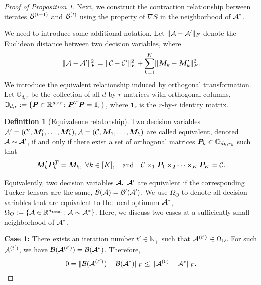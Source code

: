 \documentclass[11pt]{article}
\theoremstyle{plain}
\theoremstyle{definition}
\newtheorem{defn}{Definition}
\begin{document}
\begin{proof}[Proof of Proposition 1]
Next, we construct the contraction relationship between iterates $\mathcal{B}^{(t+1)}$ and $\mathcal{B}^{(t)}$ using the property of $\nabla S$ in the neighborhood of $\mathcal{A}^*$. 

We need to introduce some additional notation. Let $\lVert\mathcal{A}-\mathcal{A}'\rVert_F$ denote the Euclidean distance between two decision variables, where 
\begin{align}\label{eq:Fnorm}
 \lVert\mathcal{A}-\mathcal{A}'\rVert_F^2 = \lVert\mathcal{C} - \mathcal{C}'\rVert_F^2 + \sum_{k=1}^K \lVert\bm M_k - \bm M'_k\rVert_F^2.
\end{align} 
We introduce the equivalent relationship induced by orthogonal transformation. Let $\mathbb{O}_{d,r}$ be the collection of all $d$-by-$r$ matrices with orthogonal columns, $\mathbb{O}_{d,r}:=\{\bm{P}\in\mathbb{R}^{d\times r}\colon \bm{P}^T\bm{P} = \mathbf{1}_r\}$, where $\mathbf{1}_r$ is the $r$-by-$r$ identity matrix. 

\begin{defn}[Equivalence relatonship]
Two decision variables $\mathcal{A}'=(\mathcal{C}', \bm M'_1,\ldots,\bm M'_k), \mathcal{A}=(\mathcal{C}, \bm M_1,\ldots,\bm M_k)$ are called equivalent, denoted $\mathcal{A}\sim \mathcal{A}'$, if and only if there exist a set of orthogonal matrices $\bm{P}_k \in \mathbb{O}_{d_k,r_k}$ such that
\begin{align}
	\bm M'_k \bm{P}^T_k = \bm M_k ,\ \forall k \in [K], \quad \text{and}\quad \mathcal{C} \times_1 \bm{P}_1 \times_2  \dots \times_K \bm{P}_K = \mathcal{C}.
\end{align}
\end{defn}

Equivalently, two decision variables $\tA,\ \tA'$ are equivalent if the corresponding Tucker tensors are the same, $\mathcal{B}(\mathcal{A})=\mathcal{B}'(\mathcal{A}')$. We use $\Omega_O$ to denote all decision variables that are equivalent to the local optimum $\mathcal{A}^*$, $\Omega_O:=\{\mathcal{A}\in\mathbb{R}^{d_{\text{total}}}\colon \mathcal{A}\sim \mathcal{A}^*\}$. Here, we discuss two cases at a sufficiently-small neighborhood of $\mathcal{A}^*$.

\textbf{Case 1:} There exists an iteration number $t'\in\mathbb{N}_{+}$ such that $\mathcal{A}^{(t')} \in \Omega_O$. For such $\mathcal{A}^{(t')}$, we have $\mathcal{B}(\mathcal{A}^{(t')}) = \mathcal{B}(\mathcal{A}^*)$. Therefore, 
\begin{align}\label{pro:case1}
	0= \lVert\mathcal{B}(\mathcal{A}^{(t')}) - \mathcal{B}(\mathcal{A}^*)\rVert_F \leq \lVert\mathcal{A}^{(0)} - \mathcal{A}^*\rVert_F.
\end{align}


\end{proof}
\end{document}
